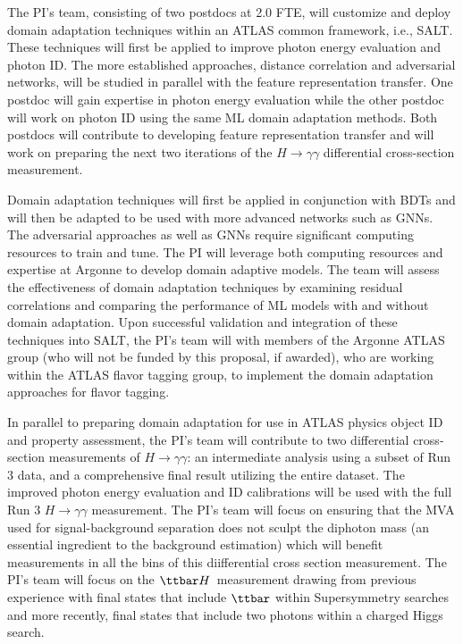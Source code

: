 \documentclass[letter, USenglish, 11pt, subfigure]{article}
\newcommand{\tth}{\ensuremath{\ttbar H}}
\begin{document}
The PI's team, consisting of two postdocs at 2.0 FTE, will customize and deploy domain adaptation techniques within an ATLAS common framework, i.e., SALT. These techniques will first be applied to improve photon energy evaluation and photon ID. The more established approaches, distance correlation and adversarial networks, will be studied in parallel with the feature representation transfer. One postdoc will gain expertise in photon energy evaluation while the other postdoc will work on photon ID using the same ML domain adaptation methods. Both postdocs will contribute to developing feature representation transfer and will work on preparing the next two iterations of the $H\to\gamma\gamma$ differential cross-section measurement.

Domain adaptation techniques will first be applied in conjunction with BDTs and will then be adapted to be used with more advanced networks such as GNNs. The adversarial approaches as well as GNNs require significant computing resources to train and tune. The PI will leverage both computing resources and expertise at Argonne to develop domain adaptive models.
The team will assess the effectiveness of domain adaptation techniques by examining residual correlations and comparing the performance of ML models with and without domain adaptation. Upon successful validation and integration of these techniques into SALT, the PI's team will with members of the Argonne ATLAS group (who will not be funded by this proposal, if awarded), who are working within the ATLAS flavor tagging group, to implement the domain adaptation approaches for flavor tagging.

In parallel to preparing domain adaptation for use in ATLAS physics object ID and property assessment, the PI's team will contribute to two differential cross-section measurements of $H\to\gamma\gamma$: an intermediate analysis using a subset of Run 3 data, and a comprehensive final result utilizing the entire dataset. The improved photon energy evaluation and ID calibrations will be used with the full Run 3 $H\to\gamma\gamma$ measurement. The PI's team will focus on ensuring that the MVA used for signal-background separation does not sculpt the diphoton mass (an essential ingredient to the background estimation) which will benefit measurements in all the bins of this diifferential cross section measurement. The PI's team will focus on the \tth\ measurement drawing from previous experience with final states that include $\ttbar$ within Supersymmetry searches and more recently, final states that include two photons within a charged Higgs search. 
\end{document}
